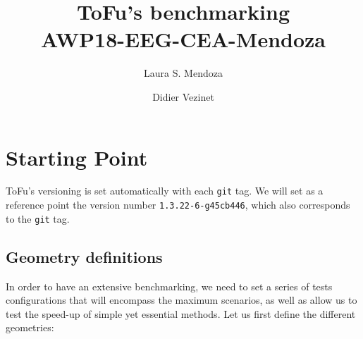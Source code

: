 \documentclass[11pt]{amsart}
\title{\Large ToFu's benchmarking\\
  \small AWP18-EEG-CEA-Mendoza}
\author{Laura S. Mendoza}
\author{Didier Vezinet}
\date{}                           %
\begin{document}
\maketitle

\section{Starting Point}

ToFu's versioning is set automatically with each \verb|git| tag.
We will set as a reference point the version number \verb|1.3.22-6-g45cb446|,
which also corresponds to the \verb|git| tag.

\subsection{Geometry definitions}
\label{sect:configs}
In order to have an extensive benchmarking, we need to set a series of tests
configurations that will encompass the maximum scenarios, as well as allow us
to test the speed-up of simple yet essential methods. Let us first define the
different geometries:\\
\end{document}
